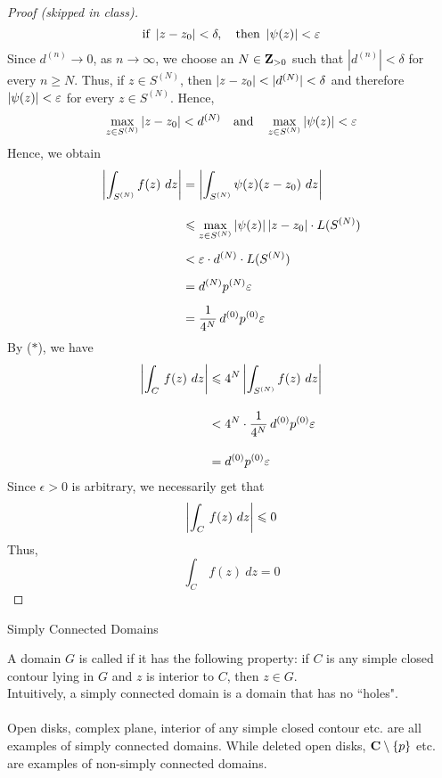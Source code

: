 \begin{proof}[Proof (skipped in class)]
\[\text{if } \left\lvert z - z_0\right\rvert < \delta,\quad \text{then } \left\lvert\psi(z)\right\rvert < \varepsilon\]
Since $d^{(n)} \to 0$, as $n \to \infty$, we choose an $N \in \mathbf Z_{>0}$ such that $|d^{(n)}|< \delta$ for every $n \geq N$. Thus, if $z \in S^{(N)}$, then $\left\lvert z - z_0\right\rvert < |d^{(N)}| < \delta$ and therefore $\left\lvert\psi(z)\right\rvert < \varepsilon$ for every $z \in S^{(N)}$. Hence, 
\[\max_{z \in S^{(N)}} \left\lvert z - z_0\right\rvert < d^{(N)} \quad \text{and} \quad \max_{z \in S^{(N)}} \left\lvert\psi(z)\right\rvert < \varepsilon\]
Hence, we obtain
\begin{align*}
\abs{\int_{S^{(N)}}f(z)\ dz} &= \abs{\int_{S^{(N)}}\psi(z)(z - z_0)\ dz}\\[1em]
 &\leq \max_{z \in S^{(N)}}\abs{\psi(z)}\abs{z - z_0}\cdot L(S^{(N)})\\[0.5em]
 &< \epsilon\cdot d^{(N)}\cdot L(S^{(N)})\\[0.5em]
 &= d^{(N)}p^{(N)}\epsilon\\[0.5em]
 &= \frac{1}{4^N}\,d^{(0)}p^{(0)}\epsilon
\end{align*}
By ($*$), we have
\begin{align*}
\left\lvert\int_C\,f(z)\ dz\right\rvert &\leqslant 4^N\left\lvert\int_{S^{(N)}}f(z)\ dz\right\rvert\\[1em]
 &< 4^N\cdot \frac{1}{4^N}\,d^{(0)}p^{(0)}\varepsilon\\[1em]
 &= d^{(0)}p^{(0)}\varepsilon
\end{align*}
Since $\epsilon > 0$ is arbitrary, we necessarily get that
\[\left\lvert\int_C\,f(z)\ dz\right\rvert \leqslant 0\]
Thus, 
\[\int_C\,f(z)\ dz = 0\]
\end{proof}

\vspace*{2em}

\begin{mdframed}
\begin{center}
{\Large Simply Connected Domains}
\end{center}
\end{mdframed}

\begin{definition}
A domain $G$ is called  if it has the following property: if $C$ is any simple closed contour lying in $G$ and $z$ is interior to $C$, then $z \in G$.\\[0.5em]
Intuitively, a simply connected domain is a domain that has no ``holes".\\
\\
Open disks, complex plane, interior of any simple closed contour etc. are all examples of simply connected domains. While deleted open disks, $\mathbf C\setminus\left\{p\right\}$ etc. are examples of non-simply connected domains.
\end{definition}

